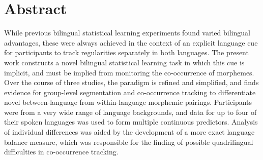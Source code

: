 \section{Abstract}
\label{Abstract}
\setlength{\parindent}{20pt}
\justifying

\noindent
While previous bilingual statistical learning experiments found varied bilingual advantages, these were always achieved in the context of an explicit language cue for participants to track regularities separately in both languages. The present work constructs a novel bilingual statistical learning task in which this cue is implicit, and must be implied from monitoring the co-occurrence of morphemes. Over the course of three studies, the paradigm is refined and simplified, and finds evidence for group-level segmentation and co-occurrence tracking to differentiate novel between-language from within-language morphemic pairings. Participants were from a very wide range of language backgrounds, and data for up to four of their spoken languages was used to form multiple continuous predictors. Analysis of individual differences was aided by the development of a more exact language balance measure, which was responsible for the finding of possible quadrilingual difficulties in co-occurrence tracking.